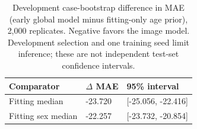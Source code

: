 \begin{table}[!t]
\centering\footnotesize
\caption{Development case-bootstrap difference in MAE (early global model minus fitting-only age prior), 2,000 replicates. Negative favors the image model. Development selection and one training seed limit inference; these are not independent test-set confidence intervals.}
\label{tab:prelim_bootstrap}
\begin{tabularx}{\columnwidth}{@{}p{27mm}XX@{}}
\toprule
Comparator & $\Delta$ MAE & 95\% interval \\
\midrule
Fitting median & -23.720 & [-25.056, -22.416] \\
Fitting sex median & -22.257 & [-23.732, -20.854] \\
\bottomrule
\end{tabularx}
\end{table}